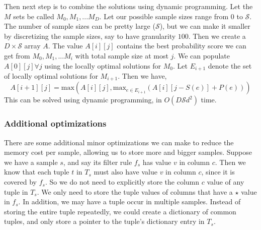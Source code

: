 \begin{comment}
Let $r_0 \in U \setminus L$. Let $d$ be the number of leaf children of $r_0$. Let the children be $r_1, r_2, ... r_d$, ordered such that $S(r_0, r_i) > S(r_0, r_j) \forall i > j$. Then we can show that for any locally optimal solution, there exist integers $i_m, i_M$ such that the following conditions hold:
$$1 \leq i_m \leq i_M \leq d$$
$$n_{r_0} = \frac{minSS}{S(r_0, r_{i_m})}$$
$$1 \leq j \leq i_m \Rightarrow n_{r_j} = 0$$
$$i_m < j \leq i_M \Leftrightarrow n_{r_j} = minSS - \frac{minSS}{S(r_0, r_{i_j})}$$
$$i_M < j \Rightarrow n_{r_j} = 0$$
And thus
$$ess(r_j) \geq minSS \Leftrightarrow j \leq i_M$$

Call this locally optimal solution $e$. Then we define its `probability value' to be
$$P(e) = \sum_{j = 1}^{i_M}p_{j}$$
and its `Sampling Cost' to be
$$S(e) = \frac{minSS}{S(r_0, r_{i_m})} + \sum_{j=i_m+1}^{i_M} minSS - \frac{minSS}{S(r_0, r_{i_j})}$$
Since there are at most $d^2$ possible values of $i_m$ and $i_M$, we can try out all of them and obtain all locally optimal solutions. 
\end{comment}

Then next step is to combine the solutions using dynamic programming. Let the $M$ sets be called $M_0, M_1, ... M_D$. Let our possible sample sizes range from $0$ to $\mathcal{S}$. The number of sample sizes can be pretty large ($\mathcal{S}$), but we can make it smaller by discretizing the sample sizes, say to have granularity $100$. Then we create a $D \times \mathcal{S}$ array $A$. The value $A\left[i\right]\left[j\right]$ contains the best probability score we can get from $M_0, M_1, ... M_i$ with total sample size at most $j$. We can populate $A\left[0\right]\left[j\right] \forall j$ using the locally optimal solutions for $M_0$. Let $E_{i+1}$ denote the set of locally optimal solutions for $M_{i+1}$. Then we have,
$$A\left[i+1\right] \left[j \right] = \textrm{max} (A\left[i\right]\left[j\right], \textrm{max}_{e \in E_{i+1}}(A\left[i\right]\left[j-S(e)\right] + P(e)))$$
This can be solved using dynamic programming, in $O(D\mathcal{S}d^2)$ time. 


\subsubsection{Additional optimizations}
There are some additional minor optimizations we can make to reduce the memory cost per sample, allowing us to store more and bigger samples. 
Suppose we have a sample $s$, and say its filter rule $f_s$ has value $v$ in column $c$. Then we know that each tuple $t$ in $T_s$ must also have value $v$ in column $c$, since it is covered by $f_s$. So we do not need to explicitly store the column $c$ value of any tuple in $T_s$. We only need to store the tuple values of columns that have a $\star$ value in $f_s$.
In addition, we may have a tuple occur in multiple samples. Instead of storing the entire tuple repeatedly, we could create a dictionary of common tuples, and only store a pointer to the tuple's dictionary entry in $T_s$. 

